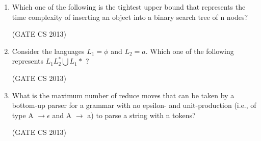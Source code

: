 \documentclass[a4paper, 11pt]{article}
\begin{document}
\begin{enumerate}
    \item Which one of the following is the tightest upper bound that represents the time complexity of inserting an object into a binary search tree of n nodes? 
    \begin{enumerate}
    \end{enumerate}
    
    \hfill (GATE CS 2013)
    
    \item  Consider the languages $L_1 =\phi $ and $ L_2 ={a }.$ Which one of the following represents $L_1L_2^*\bigcup L_1* $ ? 
    \begin{enumerate}
    \end{enumerate}
    \hfill (GATE CS 2013)
    \item What is the maximum number of reduce moves that can be taken by a bottom-up parser for a grammar with no epsilon- and unit-production (i.e., of type A $\rightarrow \epsilon$ and A $\rightarrow$ a) to parse a string with n tokens? 
    \begin{enumerate}
    \end{enumerate}

    \hfill (GATE CS 2013)
    

\end{enumerate}
\end{document}
